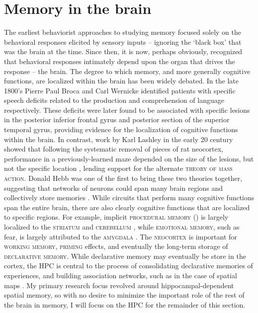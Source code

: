 \section{Memory in the brain}
\label{sec:intro:memory:structure}
The earliest behaviorist approaches to studying memory focused solely on the behavioral responses elicited by sensory inputs -- ignoring the `black box' that was the brain at the time. 
Since then, it is now, perhaps obviously, recognized that behavioral responses intimately depend upon the organ that drives the response -- the brain.
The degree to which memory, and more generally cognitive functions, are localized within the brain has been widely debated.
In the late 1800's Pierre Paul Broca and Carl Wernicke identified patients with specific speech deficits related to the production and comprehension of language respectively.
These deficits were later found to be associated with specific lesions in the posterior inferior frontal gyrus and posterior section of the superior temporal gyrus, providing evidence for the localization of cognitive functions within the brain.
In contrast, work by Karl Lashley in the early 20 century showed that following the systematic removal of pieces of rat neocortex, performance in a previously-learned maze depended on the size of the lesions, but not the specific location \citep{Lashley1929}, lending support for the alternate \textsc{theory of mass action}.
Donald Hebb was one of the first to bring these two theories together, suggesting that networks of neurons could span many brain regions and collectively store memories \citep{Hebb1949}.
While circuits that perform many cognitive functions span the entire brain, there are also clearly cognitive functions that are localized to specific regions.
For example, implicit \textsc{procedural memory} () is largely localized to the \textsc{striatum} and \textsc{cerebellum} , while \textsc{emotional memory}, such as fear, is largely attributed to the \textsc{amygdala} \citep{LeDoux2000}.
The \textsc{neocortex} is important for \textsc{working memory}, \textsc{priming} effects, and eventually the long-term storage of \textsc{declarative memory}.
While declarative memory may eventually be store in the cortex, the \ac{HPC} is central to the process of consolidating declarative memories of experiences, and building association networks, such as in the case of spatial maps \citep{Eichenbaum2000}.
My primary research focus revolved around hippocampal-dependent spatial memory, so with no desire to minimize the important role of the rest of the brain in memory, I will focus on the \ac{HPC} for the remainder of this section. 

